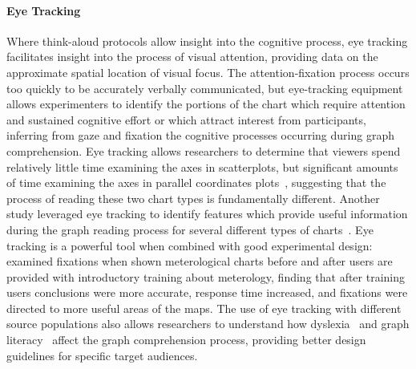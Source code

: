 \documentclass[letterpaper]{ar-1col}\usepackage[]{graphicx}\usepackage[]{color}
\begin{document}
\paragraph{Eye Tracking} %
Where think-aloud protocols allow insight into the cognitive process, eye tracking facilitates insight into the process of visual attention, providing data on the approximate spatial location of visual focus. The attention-fixation process occurs too quickly to be accurately verbally communicated, but eye-tracking equipment allows experimenters to identify the portions of the chart which require attention and sustained cognitive effort or which attract interest from participants, inferring from gaze and fixation the cognitive processes occurring during graph comprehension. Eye tracking allows researchers to determine that viewers spend relatively little time examining the axes in scatterplots, but significant amounts of time examining the axes in parallel coordinates plots~\citep{netzelComparativeEyetrackingEvaluation2017}, suggesting that the process of reading these two chart types is fundamentally different. Another study leveraged eye tracking to identify features which provide useful information during the graph reading process for several different types of charts~\citep{goldbergComparingInformationGraphics2010}. Eye tracking is a powerful tool when combined with good experimental design: \citet{fabrikantCognitivelyInspiredPerceptually2010a} examined fixations when shown meterological charts before and after users are provided with introductory training about meterology, finding that after training users conclusions were more accurate, response time increased, and fixations were directed to more useful areas of the maps. The use of eye tracking with different source populations also allows researchers to understand how dyslexia~\citep{kimInvestigatingGraphComprehension2014} and graph literacy~\citep{wollercarterCommunicatingDistortingRisks2012,okanHowPeopleLow2016} affect the graph comprehension process, providing better design guidelines for specific target audiences.


\end{document}
